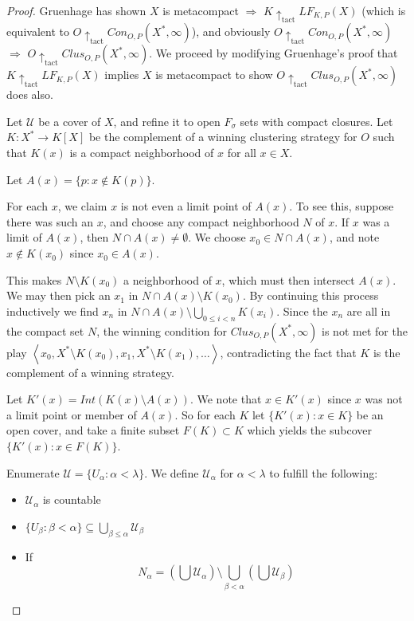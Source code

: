 \documentclass[11pt]{article}
\theoremstyle{plain}
\theoremstyle{definition}
\theoremstyle{remark}
\newcommand{\tactwin}{\uparrow_{\text{tact}}}
\newcommand{\oneptcomp}[1]{#1^*}
\newcommand{\congame}[2]{Con_{O,P}(#1,#2)}
\newcommand{\clusgame}[2]{Clus_{O,P}(#1,#2)}
\newcommand{\lfkpgame}[1]{LF_{K,P}(#1)}
\newcommand{\<}{\langle}
\renewcommand{\>}{\rangle}
\begin{document}
{\begin{proof}
Gruenhage has shown $X$ is metacompact $\Rightarrow$ $K\tactwin\lfkpgame{X}$ (which is equivalent to $O\tactwin\congame{\oneptcomp{X}}{\infty}$), and obviously $O\tactwin\congame{\oneptcomp{X}}{\infty}$ $\Rightarrow$ $O\tactwin\clusgame{\oneptcomp{X}}{\infty}$. We proceed by modifying Gruenhage's proof that $K\tactwin\lfkpgame{X}$ implies $X$ is metacompact to show $O\tactwin\clusgame{\oneptcomp{X}}{\infty}$ does also.

Let $\mathcal{U}$ be a cover of $X$, and refine it to open $F_\sigma$ sets with compact closures. Let $K:\oneptcomp{X}\to K[X]$ be the complement of a winning clustering strategy for $O$ such that $K(x)$ is a compact neighborhood of $x$ for all $x\in X$.

Let $A(x)=\{p:x\not\in K(p)\}$.

For each $x$, we claim $x$ is not even a limit point of $A(x)$. To see this, suppose there was such an $x$, and choose any compact neighborhood $N$ of $x$. If $x$ was a limit of $A(x)$, then $N\cap A(x)\not=\emptyset$. We choose $x_0\in N\cap A(x)$, and note $x\not\in K(x_0)$ since $x_0\in A(x)$.

This makes $N\setminus K(x_0)$ a neighborhood of $x$, which must then intersect $A(x)$. We may then pick an $x_1$ in $N\cap A(x)\setminus K(x_0)$. By continuing this process inductively we find $x_n$ in $N\cap A(x) \setminus \bigcup_{0\leq i < n} K(x_i)$. Since the $x_n$ are all in the compact set $N$, the winning condition for $\clusgame{\oneptcomp{X}}{\infty}$ is not met for the play $\left<x_0,\oneptcomp{X}\setminus K(x_0),x_1,\oneptcomp{X}\setminus K(x_1),\dots\right>$, contradicting the fact that $K$ is the complement of a winning strategy.

Let $K'(x)=Int(K(x)\setminus A(x))$. We note that $x\in K'(x)$ since $x$ was not a limit point or member of $A(x)$. So for each $K$ let $\{K'(x):x\in K\}$ be an open cover, and take a finite subset $F(K)\subset K$ which yields the subcover $\{K'(x):x\in F(K)\}$.

Enumerate $\mathcal{U}=\{U_\alpha: \alpha < \lambda\}$. We define $\mathcal{U}_\alpha$ for $\alpha<\lambda$ to fulfill the following:

\begin{itemize}
\item $\mathcal{U}_\alpha$ is countable
\item $\{U_\beta: \beta<\alpha\} \subseteq \bigcup_{\beta\leq\alpha} \mathcal{U}_\beta$
\item If \[N_\alpha = \left(\bigcup \mathcal{U}_\alpha\right) \setminus \bigcup_{\beta<\alpha} \left( \bigcup \mathcal{U}_\beta \right)\]


\end{itemize}
\end{proof}}
\end{document}
